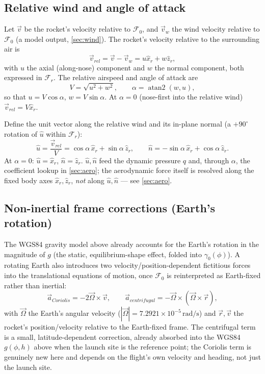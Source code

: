 \subsection{Relative wind and angle of attack}\label{sec:relwind}
Let $\vec{v}$ be the rocket's velocity relative to $\mathcal{F}_0$, and $\vec{v}_w$ the wind
velocity relative to $\mathcal{F}_0$ (a model output, \autoref{sec:wind}). The rocket's velocity
relative to the surrounding air is
\begin{equation}
    \vec{v}_{rel} = \vec{v} - \vec{v}_w = u\hat{x}_r + w\hat{z}_r,
\end{equation}
with $u$ the axial (along-nose) component and $w$ the normal component, both expressed in
$\mathcal{F}_r$. The relative airspeed and angle of attack are
\begin{equation}
    V = \sqrt{u^2+w^2}, \qquad \alpha = \operatorname{atan2}(w, u),
\end{equation}
so that $u=V\cos\alpha$, $w=V\sin\alpha$. At $\alpha=0$ (nose-first into the relative wind)
$\vec{v}_{rel}=V\hat{x}_r$.

Define the unit vector along the relative wind and its in-plane normal (a $+90^\circ$ rotation of
$\hat{u}$ within $\mathcal{F}_r$):
\begin{equation}
    \hat{u} = \frac{\vec{v}_{rel}}{V} = \cos\alpha\,\hat{x}_r + \sin\alpha\,\hat{z}_r, \qquad
    \hat{n} = -\sin\alpha\,\hat{x}_r + \cos\alpha\,\hat{z}_r.
\end{equation}
At $\alpha=0$: $\hat{u}=\hat{x}_r$, $\hat{n}=\hat{z}_r$. $\hat{u},\hat{n}$ feed the dynamic pressure
$q$ and, through $\alpha$, the coefficient lookup in \autoref{sec:aero}; the aerodynamic force
itself is resolved along the fixed body axes $\hat{x}_r,\hat{z}_r$, \emph{not} along
$\hat{u},\hat{n}$ --- see \autoref{sec:aero}.

\subsection{Non-inertial frame corrections (Earth's rotation)}\label{sec:noninertial}
The WGS84 gravity model above already accounts for the Earth's rotation in the magnitude of $g$
(the static, equilibrium-shape effect, folded into $\gamma_0(\phi)$). A rotating Earth also
introduces two velocity/position-dependent fictitious forces into the translational equations of
motion, once $\mathcal{F}_0$ is reinterpreted as Earth-fixed rather than inertial:
\begin{equation}
    \vec{a}_{Coriolis} = -2\vec{\Omega}\times\vec{v}, \qquad
    \vec{a}_{centrifugal} = -\vec{\Omega}\times(\vec{\Omega}\times\vec{r}),
\end{equation}
with $\vec{\Omega}$ the Earth's angular velocity ($|\vec{\Omega}|=7.2921\times10^{-5}\,
\mathrm{rad/s}$) and $\vec{r},\vec{v}$ the rocket's position/velocity relative to the Earth-fixed
frame. The centrifugal term is a small, latitude-dependent correction, already absorbed into the
WGS84 $g(\phi,h)$ above when the launch site is the reference point; the Coriolis term is
genuinely new here and depends on the flight's own velocity and heading, not just the launch site.

